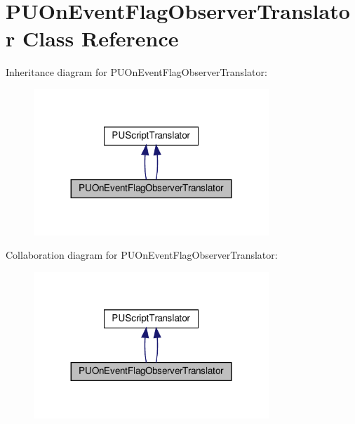 \hypertarget{classPUOnEventFlagObserverTranslator}{}\section{P\+U\+On\+Event\+Flag\+Observer\+Translator Class Reference}
\label{classPUOnEventFlagObserverTranslator}


Inheritance diagram for P\+U\+On\+Event\+Flag\+Observer\+Translator\+:
\nopagebreak
\begin{figure}[H]
\begin{center}
\leavevmode
\includegraphics[width=251pt]{classPUOnEventFlagObserverTranslator__inherit__graph}
\end{center}
\end{figure}


Collaboration diagram for P\+U\+On\+Event\+Flag\+Observer\+Translator\+:
\nopagebreak
\begin{figure}[H]
\begin{center}
\leavevmode
\includegraphics[width=251pt]{classPUOnEventFlagObserverTranslator__coll__graph}
\end{center}
\end{figure}
